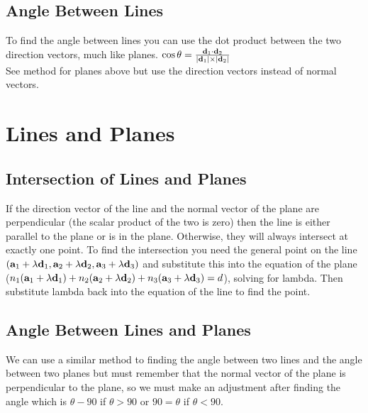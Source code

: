 \documentclass[a4paper,12pt]{article}
\begin{document}
\subsection*{Angle Between Lines}
To find the angle between lines you can use the dot product between the two direction vectors, much like planes. $\cos \theta = \frac{\bold{d}_1 \cdot \bold{d}_2}{|\bold{d}_1| \times |\bold{d}_2|}$ \\

See method for planes above but use the direction vectors instead of normal vectors. 

\section*{Lines and Planes}
\subsection*{Intersection of Lines and Planes}
If the direction vector of the line and the normal vector of the plane are perpendicular (the scalar product of the two is zero) then the line is either parallel to the plane or is in the plane. Otherwise, they will always intersect at exactly one point. To find the intersection you need the general point on the line $(\bold{a}_1 + \lambda \bold{d}_1, \bold{a}_2 + \lambda \bold{d}_2, \bold{a}_3 + \lambda \bold{d}_3)$ and substitute this into the equation of the plane ($n_1(\bold{a}_1 + \lambda \bold{d}_1) + n_2(\bold{a}_2 + \lambda \bold{d}_2) + n_3(\bold{a}_3 + \lambda \bold{d}_3) = d$), solving for lambda. Then substitute lambda back into the equation of the line to find the point. 

\subsection*{Angle Between Lines and Planes}
We can use a similar method to finding the angle between two lines and the angle between two planes but must remember that the normal vector of the plane is perpendicular to the plane, so we must make an adjustment after finding the angle which is $\theta - 90$ if $\theta > 90$ or $90 = \theta$ if $\theta < 90$.
\end{document}
